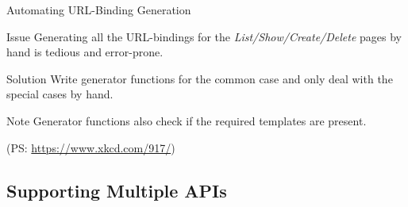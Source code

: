 \documentclass{beamer}
\begin{document}
    \begin{frame}{Automating URL-Binding Generation}
        \begin{alertblock}{Issue}
            Generating all the URL-bindings for the \emph{List/Show/Create/Delete} pages by hand is tedious and error-prone.
        \end{alertblock}

        \begin{exampleblock}{Solution}
            Write generator functions for the common case and only deal with the special cases by hand.
        \end{exampleblock}
        
        \begin{block}{Note}
            Generator functions also check if the required templates are present.
        \end{block}

        \tiny{(PS: \url{https://www.xkcd.com/917/})}
    \end{frame}

\subsection{Supporting Multiple APIs}
    
\end{document}
